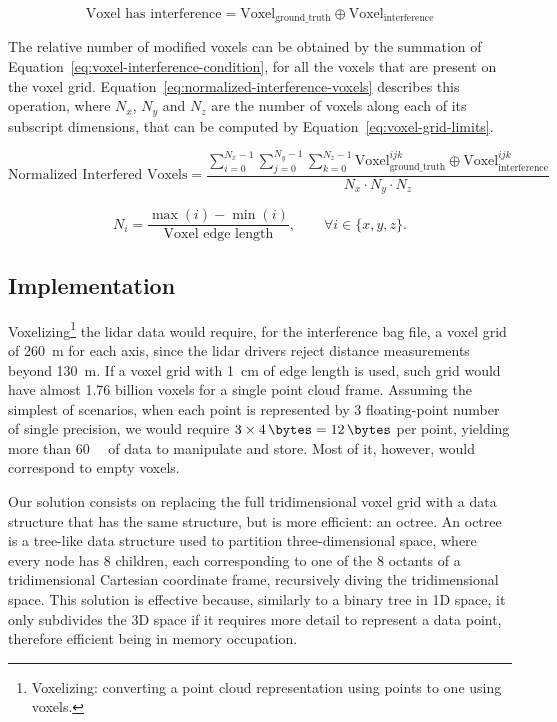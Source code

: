 \begin{equation}
	\label{eq:voxel-interference-condition}
	\text{Voxel has interference} = \text{Voxel}_\text{ground\_truth} \oplus  \text{Voxel}_\text{interference} 
\end{equation}

The relative number of modified voxels can be obtained by the summation of Equation~\eqref{eq:voxel-interference-condition}, for all the voxels that are present on the voxel grid. Equation~\eqref{eq:normalized-interference-voxels} describes this operation, where $N_x$, $N_y$ and $N_z$ are the number of voxels along each of its subscript dimensions, that can be computed by Equation~\eqref{eq:voxel-grid-limits}.

\begin{equation}
\label{eq:normalized-interference-voxels}
\text{Normalized Interfered Voxels} =\displaystyle \frac{\sum\limits^{N_x - 1}_{i = 0} \sum\limits^{N_y - 1}_{j = 0} \sum\limits^{N_z - 1}_{k = 0} \text{Voxel}_\text{ground\_truth}^{ijk} \oplus  \text{Voxel}_\text{interference}^{ijk}}{N_x\cdot N_y\cdot N_z}
\end{equation}

\begin{equation}
\label{eq:voxel-grid-limits}
N_i = \frac{\max(i) - \min(i)}{\text{Voxel edge length}}, \qquad \forall i \in \{x, y, z\}.
\end{equation}

\subsection{Implementation}
Voxelizing\footnote{Voxelizing: converting a point cloud representation using points to one using voxels.} the \ac{lidar} data would require, for the interference bag file, a voxel grid of \SI{260}{\meter} for each axis, since the \ac{lidar} drivers reject distance measurements beyond \SI{130}{\meter}. If a voxel grid with \SI{1}{\centi\meter} of edge length is used, such grid would have almost 1.76 billion voxels for a single point cloud frame. Assuming the simplest of scenarios, when each point is represented by 3 floating-point number of single precision, we would require $3\times \SI{4}{\bytes} = \SI{12}{\bytes}$ per point, yielding more than \SI{60}{\giga\byte} of data to manipulate and store. Most of it, however, would correspond to empty voxels.

Our solution consists on replacing the full tridimensional voxel grid with a data structure that has the same structure, but is more efficient: an octree. An octree is a tree-like data structure used to partition three-dimensional space, where every node has 8 children, each corresponding to one of the 8 octants of a tridimensional Cartesian coordinate frame, recursively diving the tridimensional space. This solution is effective because, similarly to a binary tree in 1D space, it only subdivides the 3D space if it requires more detail to represent a data point, therefore efficient being in memory occupation.

